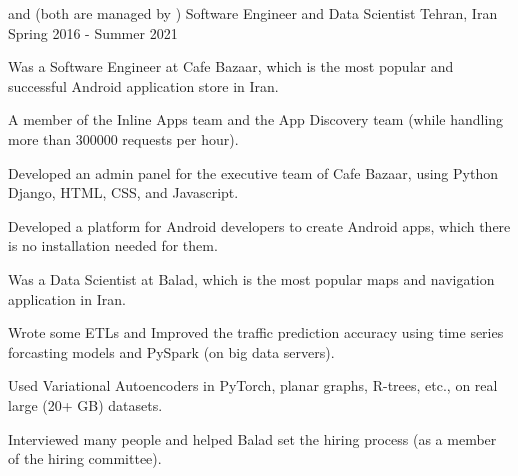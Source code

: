 \begin{cventries}
 \cventry
    { and  (both are managed by )} %
    {Software Engineer and Data Scientist} %
    {Tehran, Iran} %
    {Spring 2016 - Summer 2021} %
    {
      \begin{cvitems} %
        \item {Was a Software Engineer at Cafe Bazaar, which is the most popular and successful Android application store in Iran.}
        \item {A member of the Inline Apps team and the App Discovery team (while handling more than 300000 requests per hour).}
        \item {Developed an admin panel for the executive team of Cafe Bazaar, using Python Django, HTML, CSS, and Javascript.}
        \item {Developed a platform for Android developers to create Android apps, which there is no installation needed for them.}
        \item {Was a Data Scientist at Balad, which is the most popular maps and navigation application in Iran.}
        \item {Wrote some ETLs and Improved the traffic prediction accuracy using time series forcasting models and PySpark (on big data servers).}
        \item {Used Variational Autoencoders in PyTorch, planar graphs, R-trees, etc., on real large (20+ GB) datasets.}
        \item {Interviewed many people and helped Balad set the hiring process (as a member of the hiring committee).}
      \end{cvitems}
    }



\end{cventries}
